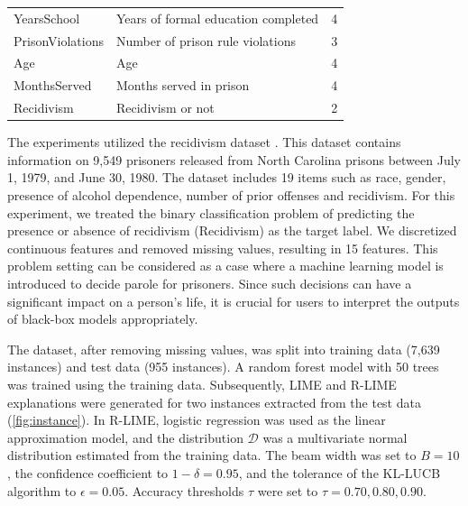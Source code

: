 \documentclass[11pt]{article}
\begin{document}
{\begin{table}[tbp]
\begin{tabular}{llc}
			YearsSchool            & Years of formal education completed   & 4                                       \\
			PrisonViolations       & Number of prison rule violations      & 3                                       \\
			Age                    & Age                                   & 4                                       \\
			MonthsServed           & Months served in prison               & 4                                       \\
			\midrule
			Recidivism             & Recidivism or not                     & 2                                       \\
			\bottomrule
		\end{tabular}
	\end{table}
}

The experiments utilized the recidivism dataset \cite{schmidt1988predicting}.
This dataset contains information on 9,549 prisoners released from
North Carolina prisons between July 1, 1979, and June 30, 1980.
The dataset includes 19 items such as race, gender,
presence of alcohol dependence, number of prior offenses and recidivism.
For this experiment,
we treated the binary classification problem of predicting
the presence or absence of recidivism (Recidivism) as the target label.
We discretized continuous features and removed missing values,
resulting in 15 features.
This problem setting can be considered as a case
where a machine learning model is introduced to decide parole for prisoners.
Since such decisions can have a significant impact on a person's life,
it is crucial for users to interpret the outputs of black-box models appropriately.

The dataset, after removing missing values,
was split into training data (7,639 instances) and test data (955 instances).
A random forest model with 50 trees was trained using the training data.
Subsequently, LIME and R-LIME explanations were generated
for two instances extracted from the test data (\cref{fig:instance}).
In R-LIME, logistic regression was used as the linear approximation model,
and the distribution $\mathcal{D}$ was a multivariate normal distribution
estimated from the training data.
The beam width was set to $B=10$,
the confidence coefficient to $1-\delta=0.95$,
and the tolerance of the KL-LUCB algorithm to $\epsilon=0.05$.
Accuracy thresholds $\tau$ were set to $\tau=0.70,0.80,0.90$.
\end{document}
